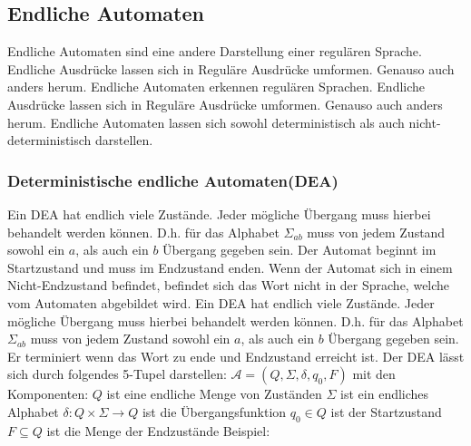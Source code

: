 \documentclass[12pt,a4paper]{article}
\begin{document}
\subsection{Endliche Automaten}
Endliche Automaten sind eine andere Darstellung einer regulären Sprache. Endliche Ausdrücke lassen sich in Reguläre Ausdrücke umformen. Genauso auch anders herum.\newline
Endliche Automaten erkennen regulären Sprachen. Endliche Ausdrücke lassen sich in Reguläre Ausdrücke umformen. Genauso auch anders herum.\newline
Endliche Automaten lassen sich sowohl deterministisch als auch nicht-deterministisch darstellen.

\subsubsection{Deterministische endliche Automaten(DEA)}
Ein DEA hat endlich viele Zustände. Jeder mögliche Übergang muss hierbei behandelt werden können. D.h. für das Alphabet $\varSigma_{ab}$ muss von jedem Zustand sowohl ein $a$, als auch ein $b$ Übergang gegeben sein. Der Automat beginnt im Startzustand und muss im Endzustand enden. Wenn der Automat sich in einem Nicht-Endzustand befindet, befindet sich das Wort nicht in der Sprache, welche vom Automaten abgebildet wird.\newline
Ein DEA hat endlich viele Zustände. Jeder mögliche Übergang muss hierbei behandelt werden können. D.h. für das Alphabet $\varSigma_{ab}$ muss von jedem Zustand sowohl ein $a$, als auch ein $b$ Übergang gegeben sein. Er terminiert wenn das Wort zu ende und Endzustand erreicht ist.
\noindent Der DEA lässt sich durch folgendes 5-Tupel darstellen:\newline
$\mathcal{A} = (Q, \varSigma, \delta, q_0, F)$ mit den Komponenten:\newline
$Q$ ist eine endliche Menge von Zuständen\newline
$\varSigma$ ist ein endliches Alphabet\newline
$\delta: Q \times \varSigma \rightarrow Q$ ist die Übergangsfunktion\newline
$q_0 \in Q$ ist der Startzustand\newline
$F \subseteq Q$ ist die Menge der Endzustände\newline
\newline
Beispiel:\newline
\end{document}
